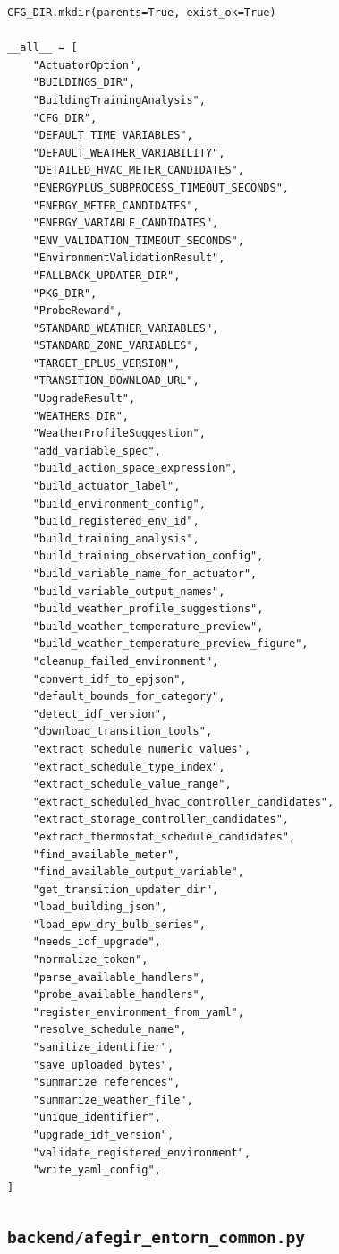 \documentclass[10pt,a4paper]{article}
\begin{document}
\begin{lstlisting}[style=studioPython,caption={backend/afegir\_entorn\_backend.py},label={lst:backend-afegir-entorn-backend-py}]
CFG_DIR.mkdir(parents=True, exist_ok=True)

__all__ = [
    "ActuatorOption",
    "BUILDINGS_DIR",
    "BuildingTrainingAnalysis",
    "CFG_DIR",
    "DEFAULT_TIME_VARIABLES",
    "DEFAULT_WEATHER_VARIABILITY",
    "DETAILED_HVAC_METER_CANDIDATES",
    "ENERGYPLUS_SUBPROCESS_TIMEOUT_SECONDS",
    "ENERGY_METER_CANDIDATES",
    "ENERGY_VARIABLE_CANDIDATES",
    "ENV_VALIDATION_TIMEOUT_SECONDS",
    "EnvironmentValidationResult",
    "FALLBACK_UPDATER_DIR",
    "PKG_DIR",
    "ProbeReward",
    "STANDARD_WEATHER_VARIABLES",
    "STANDARD_ZONE_VARIABLES",
    "TARGET_EPLUS_VERSION",
    "TRANSITION_DOWNLOAD_URL",
    "UpgradeResult",
    "WEATHERS_DIR",
    "WeatherProfileSuggestion",
    "add_variable_spec",
    "build_action_space_expression",
    "build_actuator_label",
    "build_environment_config",
    "build_registered_env_id",
    "build_training_analysis",
    "build_training_observation_config",
    "build_variable_name_for_actuator",
    "build_variable_output_names",
    "build_weather_profile_suggestions",
    "build_weather_temperature_preview",
    "build_weather_temperature_preview_figure",
    "cleanup_failed_environment",
    "convert_idf_to_epjson",
    "default_bounds_for_category",
    "detect_idf_version",
    "download_transition_tools",
    "extract_schedule_numeric_values",
    "extract_schedule_type_index",
    "extract_schedule_value_range",
    "extract_scheduled_hvac_controller_candidates",
    "extract_storage_controller_candidates",
    "extract_thermostat_schedule_candidates",
    "find_available_meter",
    "find_available_output_variable",
    "get_transition_updater_dir",
    "load_building_json",
    "load_epw_dry_bulb_series",
    "needs_idf_upgrade",
    "normalize_token",
    "parse_available_handlers",
    "probe_available_handlers",
    "register_environment_from_yaml",
    "resolve_schedule_name",
    "sanitize_identifier",
    "save_uploaded_bytes",
    "summarize_references",
    "summarize_weather_file",
    "unique_identifier",
    "upgrade_idf_version",
    "validate_registered_environment",
    "write_yaml_config",
]
\end{lstlisting}


\subsection{\texorpdfstring{\texttt{backend/afegir\_entorn\_common.py}}{backend/afegir\_entorn\_common.py}}
\end{document}
